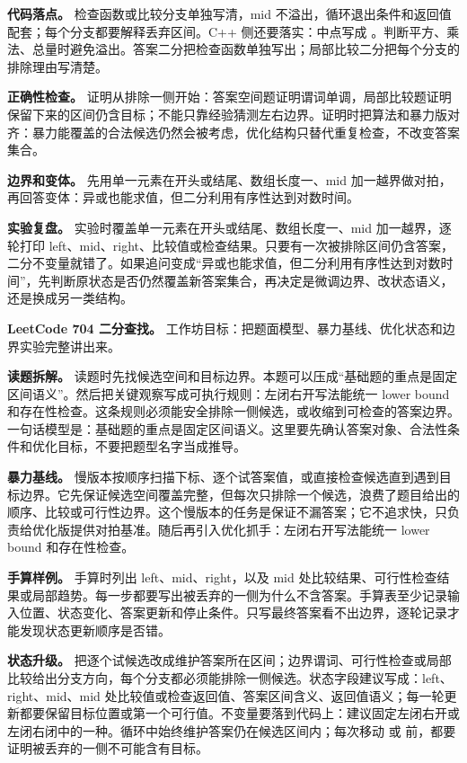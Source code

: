 \textbf{代码落点。} 检查函数或比较分支单独写清，mid 不溢出，循环退出条件和返回值配套；每个分支都要解释丢弃区间。C++ 侧还要落实：中点写成 。判断平方、乘法、总量时避免溢出。答案二分把检查函数单独写出；局部比较二分把每个分支的排除理由写清楚。

\textbf{正确性检查。} 证明从排除一侧开始：答案空间题证明谓词单调，局部比较题证明保留下来的区间仍含目标；不能只靠经验猜测左右边界。证明时把算法和暴力版对齐：暴力能覆盖的合法候选仍然会被考虑，优化结构只替代重复检查，不改变答案集合。

\textbf{边界和变体。} 先用单一元素在开头或结尾、数组长度一、mid 加一越界做对拍，再回答变体：异或也能求值，但二分利用有序性达到对数时间。

\textbf{实验复盘。} 实验时覆盖单一元素在开头或结尾、数组长度一、mid 加一越界，逐轮打印 left、mid、right、比较值或检查结果。只要有一次被排除区间仍含答案，二分不变量就错了。如果追问变成“异或也能求值，但二分利用有序性达到对数时间”，先判断原状态是否仍然覆盖新答案集合，再决定是微调边界、改状态语义，还是换成另一类结构。

\noindent\textbf{LeetCode 704 二分查找。} 工作坊目标：把题面模型、暴力基线、优化状态和边界实验完整讲出来。

\textbf{读题拆解。} 读题时先找候选空间和目标边界。本题可以压成“基础题的重点是固定区间语义”。然后把关键观察写成可执行规则：左闭右开写法能统一 lower bound 和存在性检查。这条规则必须能安全排除一侧候选，或收缩到可检查的答案边界。一句话模型是：基础题的重点是固定区间语义。这里要先确认答案对象、合法性条件和优化目标，不要把题型名字当成推导。

\textbf{暴力基线。} 慢版本按顺序扫描下标、逐个试答案值，或直接检查候选直到遇到目标边界。它先保证候选空间覆盖完整，但每次只排除一个候选，浪费了题目给出的顺序、比较或可行性边界。这个慢版本的任务是保证不漏答案；它不追求快，只负责给优化版提供对拍基准。随后再引入优化抓手：左闭右开写法能统一 lower bound 和存在性检查。

\textbf{手算样例。} 手算时列出 left、mid、right，以及 mid 处比较结果、可行性检查结果或局部趋势。每一步都要写出被丢弃的一侧为什么不含答案。手算表至少记录输入位置、状态变化、答案更新和停止条件。只写最终答案看不出边界，逐轮记录才能发现状态更新顺序是否错。

\textbf{状态升级。} 把逐个试候选改成维护答案所在区间；边界谓词、可行性检查或局部比较给出分支方向，每个分支都必须能排除一侧候选。状态字段建议写成：left、right、mid、mid 处比较值或检查返回值、答案区间含义、返回值语义；每一轮更新都要保留目标位置或第一个可行值。不变量要落到代码上：建议固定左闭右开或左闭右闭中的一种。循环中始终维护答案仍在候选区间内；每次移动  或  前，都要证明被丢弃的一侧不可能含有目标。

